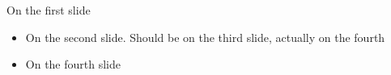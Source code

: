 \documentclass{beamer}
\begin{document}
\begin{frame}
On the first slide
\pause
\begin{itemize}[<.->]
\item On the second slide.
\pause
Should be on the third slide, actually on the fourth
\pause
\item On the fourth slide
\end{itemize}
\end{frame}
\end{document}
